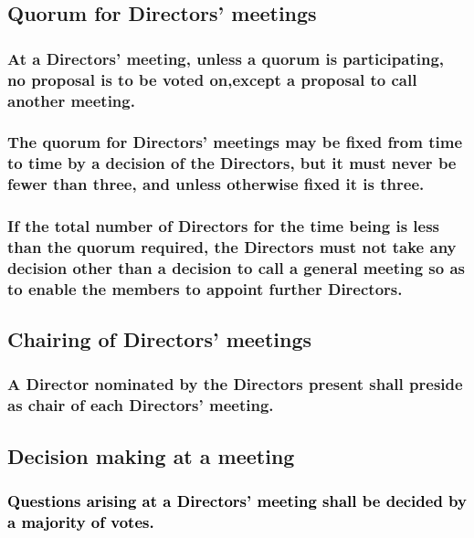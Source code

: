 \documentclass[12pt]{article}
\def\fakecolour{black}
\begin{document}
\subsection{Quorum for Directors' meetings}
\subsubsection[Quorum at Directors' meetings is fundamental]{At a Directors' meeting, unless a quorum is participating, no proposal is to be voted on,except a proposal to call another meeting.}
\subsubsection[Quorum at Directors' meetings may be fixed at any time, or default to at least three]{The quorum for Directors' meetings may be fixed from time to time by a decision of the Directors, but it must never be fewer than three, and unless otherwise fixed it is three.}
\subsubsection[If a Directors' meeting has no quorum, Directors may call a general meeting to appoint further Directors]{If the total number of Directors for the time being is less than the quorum required, the Directors must not take any decision other than a decision to call a general meeting so as to enable the members to appoint further Directors.}

\subsection{Chairing of Directors' meetings}
\subsubsection[Director to chair Directors' meeting]{A Director nominated by the Directors present shall preside as chair of each Directors' meeting.}

\subsection{Decision making at a meeting}
  \subsubsection[Majority voting at a Directors' meeting]{\textcolor{\fakecolour}{Questions arising at a Directors' meeting shall be decided by a majority of votes.}}
\end{document}
